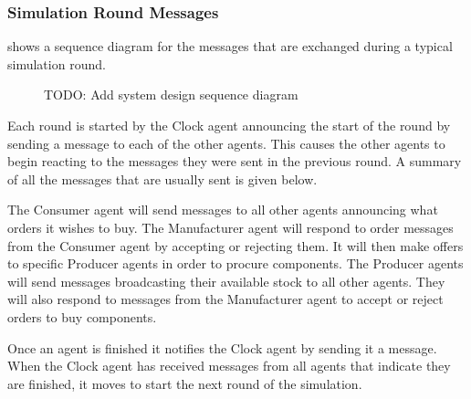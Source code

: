 \subsubsection{Simulation Round Messages}

 shows a sequence diagram for the messages that are exchanged during a typical simulation round.

\begin{figure}[h]
    \centering
    \caption{TODO\@: Add system design sequence diagram}\label{fig:system_sequence_diagram}
\end{figure}

Each round is started by the Clock agent announcing the start of the round by sending a message to each of the other agents.
This causes the other agents to begin reacting to the messages they were sent in the previous round.
A summary of all the messages that are usually sent is given below.

The Consumer agent will send messages to all other agents announcing what orders it wishes to buy.
The Manufacturer agent will respond to order messages from the Consumer agent by accepting or rejecting them.
It will then make offers to specific Producer agents in order to procure components.
The Producer agents will send messages broadcasting their available stock to all other agents.
They will also respond to messages from the Manufacturer agent to accept or reject orders to buy components.

Once an agent is finished it notifies the Clock agent by sending it a message.
When the Clock agent has received messages from all agents that indicate they are finished, it moves to start the next round of the simulation.
